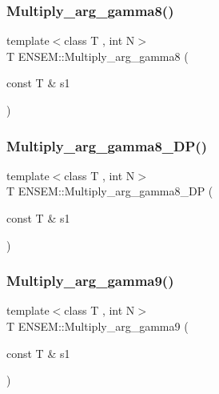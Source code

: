 \mbox{\label{namespaceENSEM_a0e88a49ab7d0591df524cdca32ea608b}} 
\subsubsection{\texorpdfstring{Multiply\_arg\_gamma8()}{Multiply\_arg\_gamma8()}}
{\footnotesize\ttfamily template$<$class T , int N$>$ \\
T E\+N\+S\+E\+M\+::\+Multiply\+\_\+arg\+\_\+gamma8 (\begin{DoxyParamCaption}\item[{const T \&}]{s1 }\end{DoxyParamCaption})\hspace{0.3cm}{\ttfamily [inline]}}

\mbox{\label{namespaceENSEM_acf415cfb4423b511f1bf7c4531c24eda}} 
\subsubsection{\texorpdfstring{Multiply\_arg\_gamma8\_DP()}{Multiply\_arg\_gamma8\_DP()}}
{\footnotesize\ttfamily template$<$class T , int N$>$ \\
T E\+N\+S\+E\+M\+::\+Multiply\+\_\+arg\+\_\+gamma8\+\_\+\+DP (\begin{DoxyParamCaption}\item[{const T \&}]{s1 }\end{DoxyParamCaption})\hspace{0.3cm}{\ttfamily [inline]}}

\mbox{\label{namespaceENSEM_a35776b4c580934c4456e696629bc8395}} 
\subsubsection{\texorpdfstring{Multiply\_arg\_gamma9()}{Multiply\_arg\_gamma9()}}
{\footnotesize\ttfamily template$<$class T , int N$>$ \\
T E\+N\+S\+E\+M\+::\+Multiply\+\_\+arg\+\_\+gamma9 (\begin{DoxyParamCaption}\item[{const T \&}]{s1 }\end{DoxyParamCaption})\hspace{0.3cm}{\ttfamily [inline]}}

